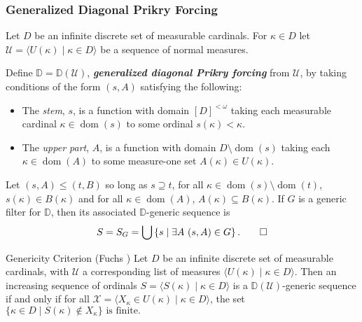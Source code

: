 \documentclass[utf8x,xcolor=svgnames,8pt]{beamer}
\newcommand{\D}{\mathbb{D}}
\renewcommand{\U}{\mathcal{U}}
\DeclareMathOperator{\dom}{dom}
\newcommand{\st}{\; | \;}
\newcommand{\set}[2]{\left\{#1\st #2 \right\}}
\newcommand{\seq}[2]{\langle #1 \st #2 \rangle}
\begin{document}
\begin{frame}
\frametitle{Generalized Diagonal Prikry Forcing}
\begin{definition}
Let $D$ be an infinite discrete set of measurable cardinals. For $\kappa \in D$ let $\U=\seq{U(\kappa)}{\kappa \in D}$ be a sequence of normal measures.

Define $\D=\D(\U)$, \emph{\textbf{generalized diagonal Prikry forcing}} from $\U$, by taking conditions of the form  
$( s, A )$ satisfying the following:
\begin{itemize}
	\item The \textit{stem}, $s$, is a function with domain $[D]^{<\omega}$ taking each measurable cardinal $\kappa \in \dom(s)$ to some ordinal $s(\kappa) < \kappa$.
	\item The \textit{upper part}, $A$, is a function with domain $D \setminus {\dom(s)}$ taking each $\kappa \in \dom(A)$ to some measure-one set $A(\kappa) \in U(\kappa)$.
\end{itemize}
Let $( s, A ) \leq ( t, B )$ so long as $s \supseteq t$, for all $\kappa \in \dom(s) \setminus \dom(t)$, $s(\kappa) \in B(\kappa)$ and for all $\kappa \in \dom(A)$, $A(\kappa) \subseteq B(\kappa)$.
If $G$ is a generic filter for $\D$, then its associated $\D$-generic sequence is \[S = S_G = \bigcup \set{ s }{ \exists A \ ( s, A ) \in G }.\qedhere\]
\end{definition}
\begin{block}{Genericity Criterion (Fuchs \cite{Fuchs:2005kx})} \label{fact:diagprikrymathias} Let $D$ be an infinite discrete set of measurable cardinals, with $\U$ a corresponding list of measures $\langle U(\kappa) \;|\; \kappa \in D \rangle$. Then an increasing sequence of ordinals $S = \langle S(\kappa) \;|\; \kappa \in D \rangle$ is a $\D(\U)$-generic  sequence if and only if for all $\mathcal X = \langle X_\kappa \in U(\kappa) \;|\; \kappa \in D \rangle$, the set $\{ \kappa \in D \;|\; S(\kappa) \notin X_\kappa\} \text{ is finite.}$
\end{block}
\end{frame}
\end{document}
